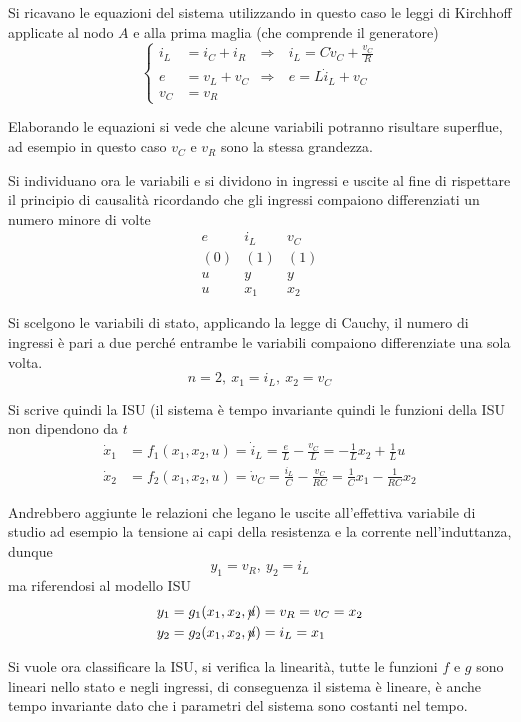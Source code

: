 Si ricavano le equazioni del sistema utilizzando in questo caso le leggi di
Kirchhoff applicate al
nodo $A$ e alla prima maglia (che comprende il generatore)
$$\left\{\begin{aligned}
i_L &= i_C + i_R &\Rightarrow&\ i_L = C\dot{v}_C + \frac{v_C}{R}\\
e &= v_L + v_C &\Rightarrow&\ e = L\dot{i}_L + v_C\\
v_C &= v_R
\end{aligned}\right.
$$

Elaborando le equazioni si vede che alcune variabili potranno risultare
superflue, ad esempio in
questo caso $v_C$ e $v_R$ sono la stessa grandezza.

Si individuano ora le variabili e si dividono in ingressi e uscite al fine di
rispettare il
principio di causalità ricordando che gli ingressi compaiono differenziati un numero minore di volte
$$\begin{matrix}
e& i_L& v_C\\
(0) & (1) & (1)\\
u & y & y\\
u & x_1 & x_2
\end{matrix}
$$

Si scelgono le variabili di stato, applicando la legge di Cauchy, il numero di
ingressi è pari a
due perché entrambe le variabili compaiono differenziate una sola volta.
$$
n=2,\ x_1 = i_L,\ x_2 = v_C
$$

Si scrive quindi la ISU (il sistema è tempo invariante quindi le funzioni della
ISU non dipendono
da $t$
$$\begin{aligned}
\dot{x}_1 &= f_1(x_1,x_2,u) = \dot{i}_L = \frac{e}{L} - \frac{v_C}{L} = -\frac{1}{L}x_2 +
\frac{1}{L} u\\
\dot{x}_2 &= f_2(x_1,x_2,u) = \dot{v}_C = \frac{i_L}{C} - \frac{v_C}{RC} = \frac{1}{C}x_1 -
\frac{1}{RC}x_2
\end{aligned}$$

Andrebbero aggiunte le relazioni che legano le uscite all'effettiva variabile di studio ad esempio
la tensione ai capi della resistenza e la corrente nell'induttanza, dunque
$$
y_1 = v_R,\ y_2 = i_L
$$
ma riferendosi al modello ISU
$$\begin{aligned}
y_1 &= g_1(x_1,x_2,\cancel{u}) = v_R = v_C = x_2\\
y_2 &= g_2(x_1,x_2,\cancel{u}) = i_L = x_1
\end{aligned}$$

Si vuole ora classificare la ISU, si verifica la linearità, tutte le funzioni $f$ e $g$ sono
lineari nello stato e negli ingressi, di conseguenza il sistema è lineare, è anche tempo invariante
dato che i parametri del sistema sono costanti nel tempo.

